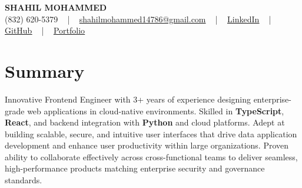 \documentclass[letterpaper,10pt]{article}
\begin{document}
\begin{center}
    {\fontsize{14pt}{12pt}\selectfont \textbf{\MakeUppercase{Shahil Mohammed}}}\\ \vspace{2pt}
    \fontsize{10pt}{12pt}\selectfont (832) 620-5379 ~ | ~ \href{mailto:shahilmohammed14786@gmail.com}{shahilmohammed14786@gmail.com} ~ | ~  
    \href{https://www.linkedin.com/in/shahil-mohammed-9652931a1/}{\color{blue}\underline{LinkedIn}}  ~ | ~ 
    \href{https://github.com/freakbeast14}{\color{blue}\underline{GitHub}} ~ | ~ 
    \href{https://shahil-mohammed.netlify.app/}{\color{blue}\underline{Portfolio}}
    \vspace{-8pt}
\end{center}

\section{Summary}
\vspace{-2pt}\fontsize{8pt}{9pt}\selectfont
Innovative Frontend Engineer with 3+ years of experience designing enterprise-grade web applications in cloud-native environments. Skilled in \textbf{TypeScript}, \textbf{React}, and backend integration with \textbf{Python} and cloud platforms. Adept at building scalable, secure, and intuitive user interfaces that drive data application development and enhance user productivity within large organizations. Proven ability to collaborate effectively across cross-functional teams to deliver seamless, high-performance products matching enterprise security and governance standards.
 \vspace{-5pt}
 
\vspace{-2pt}
\end{document}
